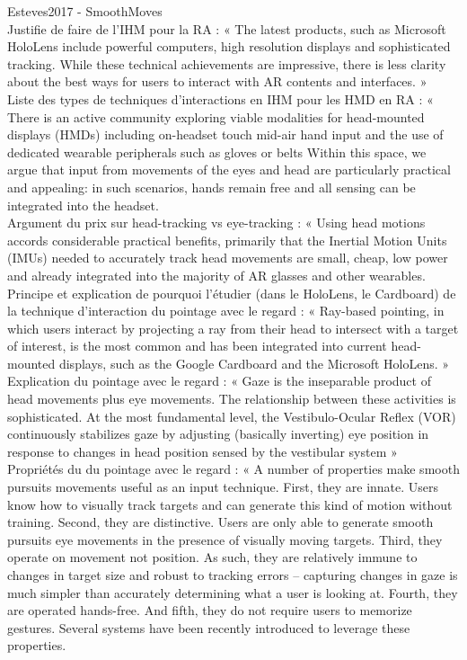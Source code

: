 Esteves2017 - SmoothMoves\\
Justifie de faire de l'IHM pour la RA : « The latest products, such as Microsoft HoloLens include powerful computers, high resolution displays and sophisticated tracking. While these technical achievements are impressive, there is less clarity about the best ways for users to interact with AR contents and interfaces. »\\
Liste des types de techniques d'interactions en IHM pour les HMD en RA : « There is an active community exploring viable modalities for head-mounted displays (HMDs) including on-headset touch mid-air hand input and the use of dedicated wearable peripherals such as gloves or belts Within this space, we argue that input from movements of the eyes and head are particularly practical and appealing: in such scenarios, hands remain free and all sensing can be integrated into the headset.\\
Argument du prix sur head-tracking vs eye-tracking : « Using head motions accords considerable practical benefits, primarily that the Inertial Motion Units (IMUs) needed to accurately track head movements are small, cheap, low power and already integrated into the majority of AR glasses and other wearables.\\
Principe et explication de pourquoi l'étudier (dans le HoloLens, le Cardboard) de la technique d'interaction du pointage avec le regard : « Ray-based pointing, in which users interact by projecting a ray from their head to intersect with a target of interest, is the most common and has been integrated into current head-mounted displays, such as the Google Cardboard and the Microsoft HoloLens. »\\
Explication du pointage avec le regard : « Gaze is the inseparable product of head movements plus eye movements. The relationship between these activities is sophisticated. At the most fundamental level, the Vestibulo-Ocular Reflex (VOR) continuously stabilizes gaze by adjusting (basically inverting) eye position in response to changes in head position sensed by the vestibular system »\\
Propriétés du du pointage avec le regard : « A number of properties make smooth pursuits movements useful as an input technique. First, they are innate. Users know how to visually track targets and can generate this kind of motion without training. Second, they are distinctive. Users are only able to generate smooth pursuits eye movements in the presence of visually moving targets. Third, they operate on movement not position. As such, they are relatively immune to changes in target size and robust to tracking errors – capturing changes in gaze is much simpler than accurately determining what a user is looking at. Fourth, they are operated hands-free. And fifth, they do not require users to memorize gestures. Several systems have been recently introduced to leverage these properties.\\
